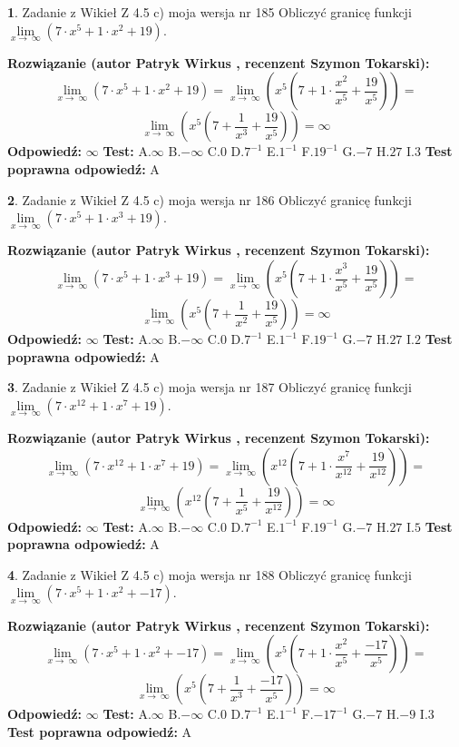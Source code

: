 \documentclass[12pt, a4paper]{article}
\theoremstyle{definition} %
\newtheorem{zad}{}
\newcommand{\zadStart}[1]{\begin{zad}#1\newline}
\newcommand{\zadStop}{\end{zad}}
\newcommand{\rozwStart}[2]{\noindent \textbf{Rozwiązanie (autor #1 , recenzent #2): }\newline}
\newcommand{\rozwStop}{\newline}
\newcommand{\odpStart}{\noindent \textbf{Odpowiedź:}\newline}
\newcommand{\odpStop}{\newline}
\newcommand{\testStart}{\noindent \textbf{Test:}\newline}
\newcommand{\testStop}{\newline}
\newcommand{\kluczStart}{\noindent \textbf{Test poprawna odpowiedź:}\newline}
\newcommand{\kluczStop}{\newline}
\begin{document}
\zadStart{Zadanie z Wikieł Z 4.5 c) moja wersja nr 185}
Obliczyć granicę funkcji  $\lim\limits_{x\to\ \infty}(7 \cdot x^{5}+1 \cdot x^{2}+19)$.
\zadStop
\rozwStart{Patryk Wirkus}{Szymon Tokarski}
$$\lim\limits_{x\to\ \infty}(7 \cdot x^{5}+1 \cdot x^{2}+19) = \lim\limits_{x\to\ \infty}(x^{5}(7 +1 \cdot \frac{x^{2}}{x^{5}}+\frac{19}{x^{5}})) =$$ $$\lim\limits_{x\to\ \infty}(x^{5}(7 +\frac{1}{x^{3}}+\frac{19}{x^{5}})) =\infty$$
\rozwStop
\odpStart
$\infty$
\odpStop
\testStart
A.$\infty$ B.$-\infty$ C.$0$ D.$7^{-1}$ E.$1^{-1}$
F.$19^{-1}$ G.$-7$
H.$27$
I.$3$
\testStop
\kluczStart
A
\kluczStop



\zadStart{Zadanie z Wikieł Z 4.5 c) moja wersja nr 186}
Obliczyć granicę funkcji  $\lim\limits_{x\to\ \infty}(7 \cdot x^{5}+1 \cdot x^{3}+19)$.
\zadStop
\rozwStart{Patryk Wirkus}{Szymon Tokarski}
$$\lim\limits_{x\to\ \infty}(7 \cdot x^{5}+1 \cdot x^{3}+19) = \lim\limits_{x\to\ \infty}(x^{5}(7 +1 \cdot \frac{x^{3}}{x^{5}}+\frac{19}{x^{5}})) =$$ $$\lim\limits_{x\to\ \infty}(x^{5}(7 +\frac{1}{x^{2}}+\frac{19}{x^{5}})) =\infty$$
\rozwStop
\odpStart
$\infty$
\odpStop
\testStart
A.$\infty$ B.$-\infty$ C.$0$ D.$7^{-1}$ E.$1^{-1}$
F.$19^{-1}$ G.$-7$
H.$27$
I.$2$
\testStop
\kluczStart
A
\kluczStop



\zadStart{Zadanie z Wikieł Z 4.5 c) moja wersja nr 187}
Obliczyć granicę funkcji  $\lim\limits_{x\to\ \infty}(7 \cdot x^{12}+1 \cdot x^{7}+19)$.
\zadStop
\rozwStart{Patryk Wirkus}{Szymon Tokarski}
$$\lim\limits_{x\to\ \infty}(7 \cdot x^{12}+1 \cdot x^{7}+19) = \lim\limits_{x\to\ \infty}(x^{12}(7 +1 \cdot \frac{x^{7}}{x^{12}}+\frac{19}{x^{12}})) =$$ $$\lim\limits_{x\to\ \infty}(x^{12}(7 +\frac{1}{x^{5}}+\frac{19}{x^{12}})) =\infty$$
\rozwStop
\odpStart
$\infty$
\odpStop
\testStart
A.$\infty$ B.$-\infty$ C.$0$ D.$7^{-1}$ E.$1^{-1}$
F.$19^{-1}$ G.$-7$
H.$27$
I.$5$
\testStop
\kluczStart
A
\kluczStop



\zadStart{Zadanie z Wikieł Z 4.5 c) moja wersja nr 188}
Obliczyć granicę funkcji  $\lim\limits_{x\to\ \infty}(7 \cdot x^{5}+1 \cdot x^{2}+-17)$.
\zadStop
\rozwStart{Patryk Wirkus}{Szymon Tokarski}
$$\lim\limits_{x\to\ \infty}(7 \cdot x^{5}+1 \cdot x^{2}+-17) = \lim\limits_{x\to\ \infty}(x^{5}(7 +1 \cdot \frac{x^{2}}{x^{5}}+\frac{-17}{x^{5}})) =$$ $$\lim\limits_{x\to\ \infty}(x^{5}(7 +\frac{1}{x^{3}}+\frac{-17}{x^{5}})) =\infty$$
\rozwStop
\odpStart
$\infty$
\odpStop
\testStart
A.$\infty$ B.$-\infty$ C.$0$ D.$7^{-1}$ E.$1^{-1}$
F.$-17^{-1}$ G.$-7$
H.$-9$
I.$3$
\testStop
\kluczStart
A
\kluczStop
\end{document}
